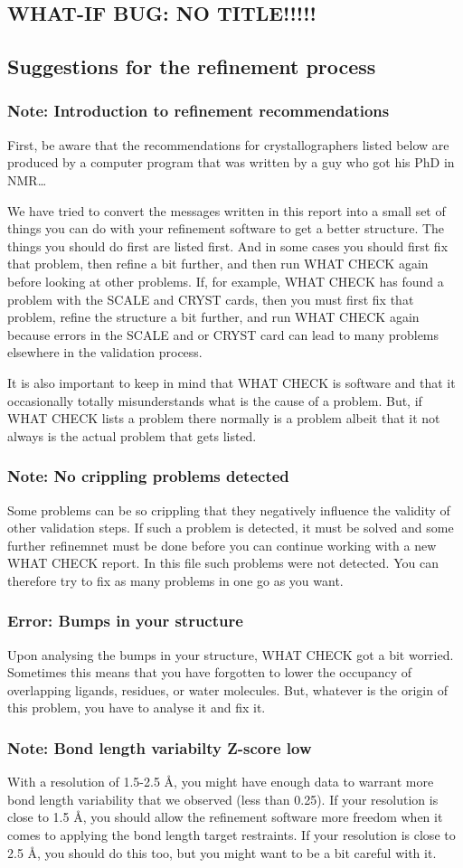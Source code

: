 \documentclass[a4paper]{article}
\def\showsect#1{
  \thesect\gdef\thesect{}
  \thessect\gdef\thessect{}
  \subsubsection{#1}
}
\def\ssect#1{
  \gdef\thessect{\subsection{#1}}
}
\gdef\thesect{\pagebreak[2]\section{WHAT-IF BUG: NO TITLE!!!!!}}
\gdef\thessect{\subsection{General}}
\begin{document}
\ssect{Suggestions for the refinement process}
\begin{note}
\showsect{Note: Introduction to refinement recommendations}
First, be aware that the recommendations for crystallographers listed below
are produced by a computer program that was written by a guy who got his
PhD in NMR{\ldots}
 
We have tried to convert the messages written in this report into a small
set of things you can do with your refinement software to get a better
structure. The things you should do first are listed first. And in some
cases you should first fix that problem, then refine a bit further, and
then run WHAT CHECK again before looking at other problems. If, for example,
WHAT CHECK has found a problem with the SCALE and CRYST cards, then you must
first fix that problem, refine the structure a bit further, and run WHAT
CHECK again because errors in the SCALE and or CRYST card can lead to many
problems elsewhere in the validation process.
 
It is also important to keep in mind that WHAT CHECK is software and that it
occasionally totally misunderstands what is the cause of a problem. But, if
WHAT CHECK lists a problem there normally is a problem albeit that it not
always is the actual problem that gets listed.
\end{note}

\begin{note}
\showsect{Note: No crippling problems detected}
Some problems can be so crippling that they negatively influence the
validity of other validation steps. If such a problem is detected, it must
be solved and some further refinemnet must be done before you can continue
working with a new WHAT CHECK report. In this file such problems were not
detected. You can therefore try to fix as many problems in one go as you
want.
\end{note}

\begin{error}
\showsect{Error: Bumps in your structure}
Upon analysing the bumps in your structure, WHAT CHECK got a bit
worried. Sometimes this means that you have forgotten to lower the
occupancy of overlapping ligands, residues, or water molecules. But,
whatever is the origin of this problem, you have to analyse it and
fix it.
\end{error}

\begin{note}
\showsect{Note: Bond length variabilty Z-score low}
With a resolution of 1.5-2.5 {\AA}, you might have enough data to warrant
more bond length variability that we observed (less than 0.25). If your
resolution is close to 1.5 {\AA}, you should allow the refinement
software more freedom when it comes to applying the bond length target
restraints. If your resolution is close to 2.5 {\AA}, you should do
this too, but you might want to be a bit careful with it.
\end{note}
\end{document}
